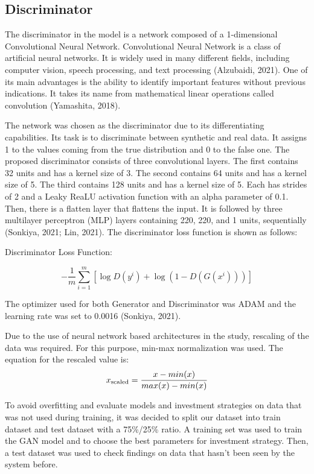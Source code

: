 \documentclass[review]{elsarticle} %
\begin{document}
\subsection{Discriminator}

The discriminator in the model is a network composed of a 1-dimensional Convolutional Neural Network. 
Convolutional Neural Network is a class of artificial neural networks. It is widely used in many different fields, including computer vision, speech processing, and text processing (Alzubaidi, 2021). One of its main advantages is the ability to identify important features without previous indications. It takes its name from mathematical linear operations called convolution (Yamashita, 2018).

The network was chosen as the discriminator due to its differentiating capabilities. Its task is to discriminate between synthetic and real data. It assigns 1 to the values coming from the true distribution and 0 to the false one. 
The proposed discriminator consists of three convolutional layers. The first contains 32 units and has a kernel size of 3. The second contains 64 units and has a kernel size of 5. The third contains 128 units and has a kernel size of 5. Each has strides of 2 and a Leaky ReaLU activation function with an alpha parameter of 0.1. Then, there is a flatten layer that flattens the input. It is followed by three multilayer perceptron (MLP) layers containing 220, 220, and 1 units, sequentially (Sonkiya, 2021; Lin, 2021). 
The discriminator loss function is shown as follows: 
\begin{center}  Discriminator Loss Function: \end{center}
\begin{equation}
-\frac{1}{m} \sum_{i=1}^{m}\left[\log D\left(y^{i}\right)+\log \left(1-D\left(G\left(x^{i}\right)\right)\right)\right]
\end{equation}

The optimizer used for both Generator and Discriminator was ADAM and the learning rate was set to 0.0016 (Sonkiya, 2021).

Due to the use of neural network based architectures in the study, rescaling of the data was required. For this purpose, min-max normalization was used. The equation for the rescaled value is: 
\begin{equation} x\textsubscript{scaled} = \frac{x - min(x)}{max(x) - min(x)} \end{equation}

To avoid overfitting and evaluate models and investment strategies on data that was not used during training, it was decided to split our dataset into train dataset and test dataset with a 75\%/25\% ratio. A training set was used to train the GAN model and to choose the best parameters for investment strategy. Then, a test dataset was used to check findings on data that hasn't been seen by the system before.
\end{document}
